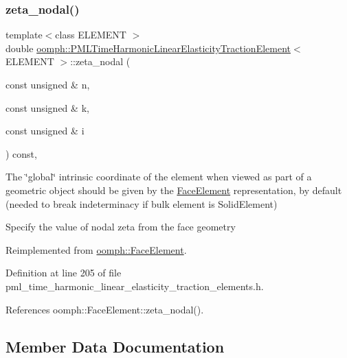 \subsubsection{\texorpdfstring{zeta\+\_\+nodal()}{zeta\_nodal()}}
{\footnotesize\ttfamily template$<$class E\+L\+E\+M\+E\+NT $>$ \\
double \hyperlink{classoomph_1_1PMLTimeHarmonicLinearElasticityTractionElement}{oomph\+::\+P\+M\+L\+Time\+Harmonic\+Linear\+Elasticity\+Traction\+Element}$<$ E\+L\+E\+M\+E\+NT $>$\+::zeta\+\_\+nodal (\begin{DoxyParamCaption}\item[{const unsigned \&}]{n,  }\item[{const unsigned \&}]{k,  }\item[{const unsigned \&}]{i }\end{DoxyParamCaption}) const\hspace{0.3cm}{\ttfamily [inline]}, {\ttfamily [virtual]}}



The \char`\"{}global\char`\"{} intrinsic coordinate of the element when viewed as part of a geometric object should be given by the \hyperlink{classoomph_1_1FaceElement}{Face\+Element} representation, by default (needed to break indeterminacy if bulk element is Solid\+Element) 

Specify the value of nodal zeta from the face geometry 

Reimplemented from \hyperlink{classoomph_1_1FaceElement_a58c9f93705c7741f76c8487d152e68a6}{oomph\+::\+Face\+Element}.



Definition at line 205 of file pml\+\_\+time\+\_\+harmonic\+\_\+linear\+\_\+elasticity\+\_\+traction\+\_\+elements.\+h.



References oomph\+::\+Face\+Element\+::zeta\+\_\+nodal().



\subsection{Member Data Documentation}
\mbox{\label{classoomph_1_1PMLTimeHarmonicLinearElasticityTractionElement_ae7504f02abb41d99815ed97bec261672}} 
